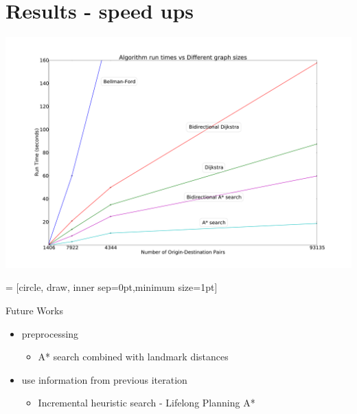 \documentclass{beamer}
\begin{document}
\section{Results - speed ups}
\begin{frame}
    \includegraphics[width=\paperwidth, height=\paperheight, keepaspectratio, trim=0 0 0 60pt, clip]{img/runtime}
    \pause

     = [circle, draw, inner sep=0pt,minimum size=1pt]
\end{frame}

\begin{frame}{Future Works}
    \pause
    \begin{itemize}[<+->]
        \item preprocessing
            \begin{itemize}
                \item A* search combined with landmark distances
            \end{itemize}
        \item use information from previous iteration
            \begin{itemize}
                \item Incremental heuristic search - Lifelong Planning A*
            \end{itemize}
    \end{itemize}
\end{frame}
\end{document}
